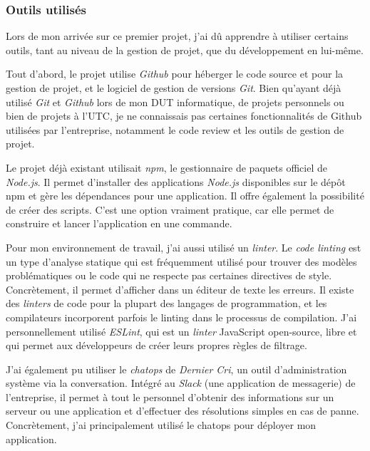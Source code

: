 \bigskip

\subsubsection{Outils utilisés}\label{outils-utilisuxe9s}

\bigskip

Lors de mon arrivée sur ce premier projet, j'ai dû apprendre à utiliser
certains outils, tant au niveau de la gestion de projet, que du
développement en lui-même.

\bigskip

Tout d'abord, le projet utilise \emph{Github} pour héberger le code
source et pour la gestion de projet, et le logiciel de gestion de
versions \emph{Git}. Bien qu'ayant déjà utilisé \emph{Git} et
\emph{Github} lors de mon DUT informatique, de projets personnels ou
bien de projets à l'UTC, je ne connaissais pas certaines fonctionnalités
de Github utilisées par l'entreprise, notamment le code review et les
outils de gestion de projet.

\bigskip

Le projet déjà existant utilisait \emph{npm}, le gestionnaire de paquets
officiel de \emph{Node.js}. Il permet d'installer des applications
\emph{Node.js} disponibles sur le dépôt npm et gère les dépendances pour
une application. Il offre également la possibilité de créer des scripts.
C'est une option vraiment pratique, car elle permet de construire et
lancer l'application en une commande.

\bigskip

Pour mon environnement de travail, j'ai aussi utilisé un \emph{linter}.
Le \emph{code linting} est un type d'analyse statique qui est
fréquemment utilisé pour trouver des modèles problématiques ou le code
qui ne respecte pas certaines directives de style. Concrètement, il
permet d'afficher dans un éditeur de texte les erreurs. Il existe des
\emph{linters} de code pour la plupart des langages de programmation, et
les compilateurs incorporent parfois le linting dans le processus de
compilation. J'ai personnellement utilisé \emph{ESLint}, qui est un
\emph{linter} JavaScript open-source, libre et qui permet aux
développeurs de créer leurs propres règles de filtrage.

\bigskip

J'ai également pu utiliser le \emph{chatops} de \emph{Dernier Cri}, un
outil d'administration système via la conversation. Intégré au
\emph{Slack} (une application de messagerie) de l'entreprise, il permet
à tout le personnel d'obtenir des informations sur un serveur ou une
application et d'effectuer des résolutions simples en cas de panne.
Concrètement, j'ai principalement utilisé le chatops pour déployer mon
application.

